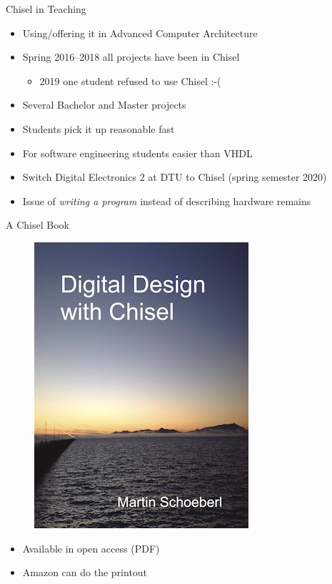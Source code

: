 \documentclass[xcolor=pdflatex,dvipsnames,table]{beamer}
\begin{document}
\begin{frame}[fragile]{Chisel in Teaching}
\begin{itemize}
\item Using/offering it in Advanced Computer Architecture
\item Spring 2016--2018 all projects have been in Chisel
\begin{itemize}
\item 2019 one student refused to use Chisel :-(
\end{itemize}
\item Several Bachelor and Master projects
\item Students pick it up reasonable fast
\item For software engineering students easier than VHDL
\item Switch Digital Electronics 2 at DTU to Chisel (spring semester 2020)
\item Issue of \emph{writing a program} instead of describing hardware remains
\end{itemize}
\end{frame}


\begin{frame}[fragile]{A Chisel Book}
\begin{figure}
    \centering
    \href{https://github.com/schoeberl/chisel-book}{\includegraphics[scale=0.4]{../cover-small}}
\end{figure}

\begin{itemize}
\item Available in open access (PDF)
\item Amazon can do the printout
\end{itemize}
\end{frame}
\end{document}
